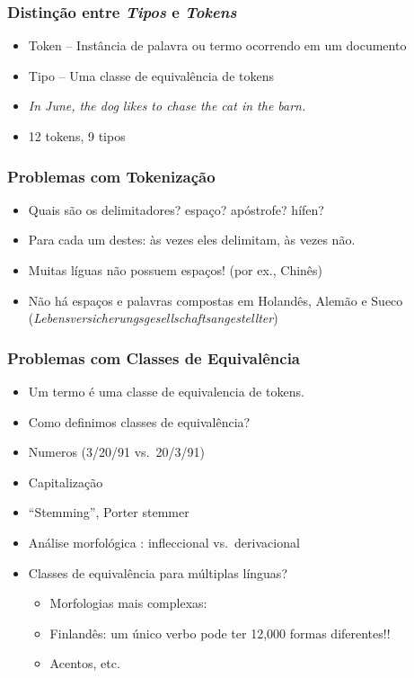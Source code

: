 \documentclass[compress]{beamer}
\def\myblue#1{\textcolor{texblue}{#1}}
\begin{document}
\begin{frame}
\frametitle{Distinção entre \textit{Tipos} e \textit{Tokens}}
\begin{itemize}
\item \myblue{Token} -- Instância de palavra ou termo ocorrendo em um documento
\item \myblue{Tipo} -- Uma classe de equivalência de tokens
\item \emph{In June, the dog likes to chase the cat in the barn.}
\item 12 tokens, 9 tipos
\end{itemize}
\end{frame}

\begin{frame}
\frametitle{Problemas com  Tokenização}
\begin{itemize}
\item Quais são os delimitadores? espaço? apóstrofe? hífen? 
\item Para cada um destes: às vezes eles delimitam, às vezes não.
\item Muitas líguas não possuem espaços! (por ex., Chinês)
\item Não há espaços e palavras compostas em Holandês, Alemão e Sueco
(\emph{Lebensversicherungsgesellschaftsangestellter})
\end{itemize}
\end{frame}


\begin{frame}
\frametitle{Problemas com Classes de Equivalência}
\begin{itemize}
\item Um termo é uma classe de equivalencia de tokens.
\item Como definimos classes de equivalência?
\item Numeros (3/20/91 vs.\ 20/3/91)
\item Capitalização
\item ``Stemming'', Porter stemmer
\item Análise morfológica : infleccional vs.\ derivacional
\item Classes de equivalência para múltiplas línguas?
\begin{itemize}
\item Morfologias mais complexas: 
\item Finlandês: um único verbo pode ter 12,000 formas diferentes!!
\item Acentos, etc.
\end{itemize}
\end{itemize}
\end{frame}
\end{document}
